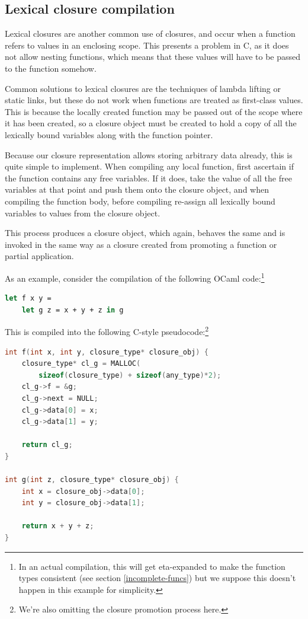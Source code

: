 \documentclass[12pt,a4paper,twoside,openright]{report}
\begin{document}
\subsection{Lexical closure compilation}

Lexical closures are another common use of closures, and occur when a function 
refers to values in an enclosing scope. This presents a problem in C, as it 
does not allow nesting functions, which means that these values will have to be 
passed to the function somehow.

Common solutions to lexical closures are the techniques of lambda lifting or 
static links, but these do not work when functions are treated as first-class 
values. This is because the locally created function may be passed out of the 
scope where it has been created, so a closure object must be created to hold a 
copy of all the lexically bound variables along with the function pointer.

Because our closure representation allows storing arbitrary data already, this 
is quite simple to implement. When compiling any local function, first 
ascertain if the function contains any free variables. If it does, take the 
value of all the free variables at that point and push them onto the closure 
object, and when compiling the function body, before compiling re-assign all 
lexically bound variables to values from the closure object.

This process produces a closure object, which again, behaves the same and is 
invoked in the same way as a closure created from promoting a function or 
partial application.

As an example, consider the compilation of the following OCaml 
code:\footnote{In an actual compilation, this will get eta-expanded to make the 
function types consistent (see section \ref{incomplete-funcs}) but we suppose 
this doesn't happen in this example for simplicity.}

\begin{lstlisting}[language=Caml]
let f x y =
    let g z = x + y + z in g
\end{lstlisting}

This is compiled into the following C-style pseudocode:\footnote{We're also 
omitting the closure promotion process here.}

\begin{lstlisting}[language=C]
int f(int x, int y, closure_type* closure_obj) {
    closure_type* cl_g = MALLOC(
        sizeof(closure_type) + sizeof(any_type)*2);
    cl_g->f = &g;
    cl_g->next = NULL;
    cl_g->data[0] = x;
    cl_g->data[1] = y;
    
    return cl_g;
}

int g(int z, closure_type* closure_obj) {
    int x = closure_obj->data[0];
    int y = closure_obj->data[1];
    
    return x + y + z;
}
\end{lstlisting}
\end{document}
